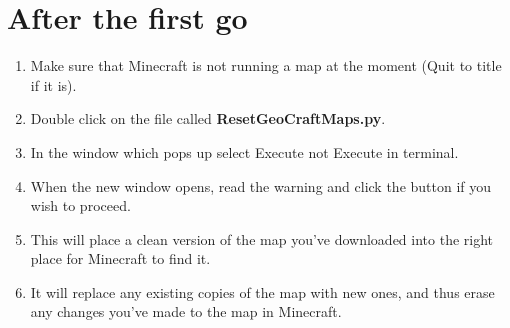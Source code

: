 \documentclass{geocraft-worksheet-multipage}
\begin{document}
\section*{After the first go}
\begin{enumerate}
\item Make sure that Minecraft is not running a map at the moment
  (Quit to title if it is).
\item Double click on the file called \textbf{ResetGeoCraftMaps.py}.
\item In the window which pops up select Execute not Execute in terminal.
\item When the new window opens, read the warning and click the button
  if you wish to proceed.
\item This will place a clean version of the map you've downloaded
  into the right place for Minecraft to find it. 
\item It will replace any existing copies of the map with new ones,
  and thus erase any changes you've made to the map in Minecraft.
\end{enumerate}
\end{document}
